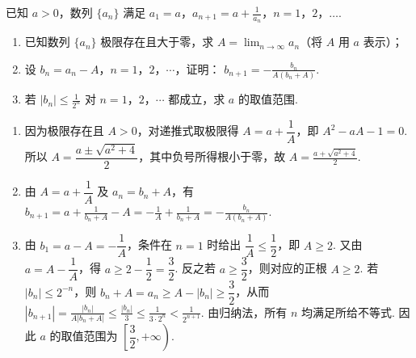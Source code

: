 \begin{problem}
已知 \(a > 0\)，数列 \(\{a_n\}\) 满足 \(a_1 = a\)，\(a_{n+1} = a + \frac{1}{a_n}\)，\(n = 1\)，\(2\)，\(\ldots\).

\begin{enumerate}
\item 已知数列 \(\{a_n\}\) 极限存在且大于零，求 \(A = \displaystyle\lim_{n \to \infty} a_n\)（将 \(A\) 用 \(a\) 表示）；
\item 设 \(b_n = a_n - A\)，\(n = 1\)，\(2\)，\(\cdots\)，证明： \(b_{n+1} = -\frac{b_n}{A(b_n + A)}\).
\item 若 \(|b_n| \leqslant \frac{1}{2^n}\) 对 \(n = 1\)，\(2\)，\(\cdots\) 都成立，求 \(a\) 的取值范围.
\end{enumerate}
\end{problem}

\begin{solution}
\begin{enumerate}
\item 因为极限存在且 \(A>0\)，对递推式取极限得 \(A=a+\dfrac1A\)，即 \(A^2-aA-1=0\). 所以 \(A=\dfrac{a\pm\sqrt{a^2+4}}2\)，其中负号所得根小于零，故 \(\displaystyle A=\frac{a+\sqrt{a^2+4}}2\).
\item 由 \(A=a+\dfrac1A\) 及 \(a_n=b_n+A\)，有 \(\displaystyle b_{n+1}=a+\frac1{b_n+A}-A=-\frac1A+\frac1{b_n+A}=-\frac{b_n}{A(b_n+A)}\).
\item 由 \(b_1=a-A=-\dfrac1A\)，条件在 \(n=1\) 时给出 \(\dfrac1A\leqslant\dfrac12\)，即 \(A\geqslant2\). 又由 \(a=A-\dfrac1A\)，得 \(a\geqslant2-\dfrac12=\dfrac32\). 反之若 \(a\geqslant\dfrac32\)，则对应的正根 \(A\geqslant2\). 若 \(|b_n|\leqslant2^{-n}\)，则 \(b_n+A=a_n\geqslant A-|b_n|\geqslant\dfrac32\)，从而
\(\displaystyle |b_{n+1}|=\frac{|b_n|}{A|b_n+A|}\leqslant\frac{|b_n|}{3}\leqslant\frac{1}{3\cdot2^n}<\frac{1}{2^{n+1}}\). 由归纳法，所有 \(n\) 均满足所给不等式. 因此 \(a\) 的取值范围为 \(\left[\dfrac32,+\infty\right)\).
\end{enumerate}
\end{solution}
